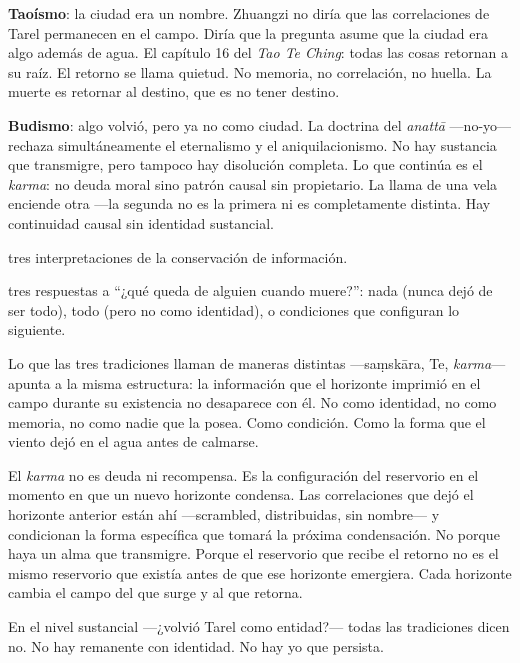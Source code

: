 \textbf{Taoísmo}: la ciudad era un nombre. Zhuangzi no diría que las correlaciones de Tarel permanecen en el campo. Diría que la pregunta asume que la ciudad era algo además de agua. El capítulo 16 del \emph{Tao Te Ching}: todas las cosas retornan a su raíz. El retorno se llama quietud. No memoria, no correlación, no huella. La muerte es retornar al destino, que es no tener destino.

\textbf{Budismo}: algo volvió, pero ya no como ciudad. La doctrina del \emph{anattā} —no-yo— rechaza simultáneamente el eternalismo y el aniquilacionismo. No hay sustancia que transmigre, pero tampoco hay disolución completa. Lo que continúa es el \emph{karma}: no deuda moral sino patrón causal sin propietario. La llama de una vela enciende otra —la segunda no es la primera ni es completamente distinta. Hay continuidad causal sin identidad sustancial.

\begin{fisica}
 tres interpretaciones de la conservación de información.

 tres respuestas a “¿qué queda de alguien cuando muere?”: nada (nunca dejó de ser todo), todo (pero no como identidad), o condiciones que configuran lo siguiente.
\end{fisica}
\noindent Lo que las tres tradiciones llaman de maneras distintas —saṃskāra, Te, \emph{karma}— apunta a la misma estructura: la información que el horizonte imprimió en el campo durante su existencia no desaparece con él. No como identidad, no como memoria, no como nadie que la posea. Como condición. Como la forma que el viento dejó en el agua antes de calmarse.

El \emph{karma} no es deuda ni recompensa. Es la configuración del reservorio en el momento en que un nuevo horizonte condensa. Las correlaciones que dejó el horizonte anterior están ahí —scrambled, distribuidas, sin nombre— y condicionan la forma específica que tomará la próxima condensación. No porque haya un alma que transmigre. Porque el reservorio que recibe el retorno no es el mismo reservorio que existía antes de que ese horizonte emergiera. Cada horizonte cambia el campo del que surge y al que retorna.

\noindent En el nivel sustancial —¿volvió Tarel como entidad?— todas las tradiciones dicen no. No hay remanente con identidad. No hay yo que persista.

